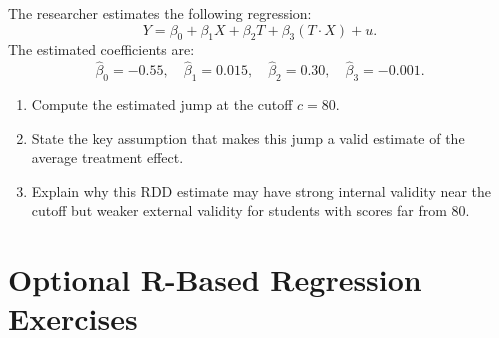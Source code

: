 \documentclass[12pt]{article}
\newif\ifsolutions
\begin{document}
\begin{enumerate}
    The researcher estimates the following regression:
    \[
        Y = \beta_0 + \beta_1X + \beta_2T + \beta_3(T\cdot X) + u.
    \]
    The estimated coefficients are:
    \[
        \widehat\beta_0 = -0.55, \quad
        \widehat\beta_1 = 0.015, \quad
        \widehat\beta_2 = 0.30, \quad
        \widehat\beta_3 = -0.001.
    \]

    \begin{enumerate}[label=(\alph*)]
        \item Compute the estimated jump at the cutoff \(c=80\).
        \item State the key assumption that makes this jump a valid estimate of the average treatment effect.
        \item Explain why this RDD estimate may have strong internal validity near the cutoff but weaker external validity for students with scores far from 80.
    \end{enumerate}

    \ifsolutions \color{blue} \textbf{Solution:} \\
    \begin{enumerate}[label=(\alph*)]
        \item In the one-regression formulation, the jump at cutoff \(c\) is
        \[
            \widehat\beta_2 + \widehat\beta_3 c.
        \]
        For \(c=80\):
        \[
            0.30 + (-0.001)(80) = 0.30 - 0.08 = 0.22.
        \]
        The estimated jump is 0.22, or 22 percentage points.

        \item The key assumption is that students just below and just above the cutoff are similar in all relevant respects except for receiving the scholarship (the treatment). Equivalently, potential outcomes should be continuous at the cutoff in the absence of treatment.
        \item The design compares students very close to the cutoff, so it can be credible for estimating the local effect of the scholarship around 80 points. However, this effect may not generalize to students with much lower or much higher exam scores, who may differ in motivation, preparation, financial need, or university plans.
    \end{enumerate}
    \fi \color{black}

\end{enumerate}

\clearpage
\section*{Optional R-Based Regression Exercises}
\end{document}
